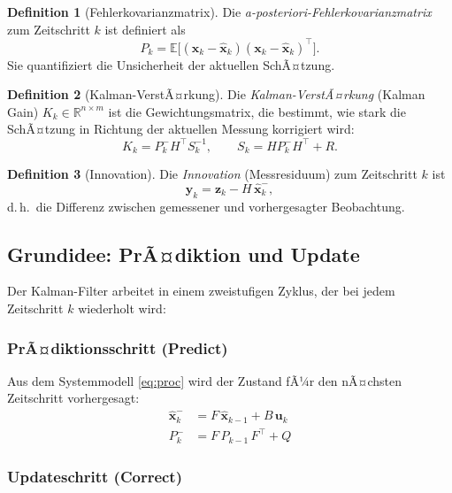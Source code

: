 ﻿\documentclass[a4paper,12pt]{article}
\theoremstyle{definition}
\newtheorem{definition}{Definition}
\begin{document}
\begin{definition}[Fehlerkovarianzmatrix]
    Die \emph{a-posteriori-Fehlerkovarianzmatrix} zum Zeitschritt $k$ ist definiert als
    \[
        P_k = \mathbb{E}\bigl[(\mathbf{x}_k - \hat{\mathbf{x}}_k)
                              (\mathbf{x}_k - \hat{\mathbf{x}}_k)^\top\bigr].
    \]
    Sie quantifiziert die Unsicherheit der aktuellen SchÃ¤tzung.
\end{definition}

\begin{definition}[Kalman-VerstÃ¤rkung]
    Die \emph{Kalman-VerstÃ¤rkung} (Kalman Gain) $K_k \in \mathbb{R}^{n \times m}$ ist
    die Gewichtungsmatrix, die bestimmt, wie stark die SchÃ¤tzung in Richtung der
    aktuellen Messung korrigiert wird:
    \[
        K_k = P_k^- H^\top S_k^{-1},
        \qquad S_k = H P_k^- H^\top + R.
    \]
\end{definition}

\begin{definition}[Innovation]
    Die \emph{Innovation} (Messresiduum) zum Zeitschritt $k$ ist
    \[
        \mathbf{y}_k = \mathbf{z}_k - H\,\hat{\mathbf{x}}_k^-,
    \]
    d.\,h.\ die Differenz zwischen gemessener und vorhergesagter Beobachtung.
\end{definition}

\subsection{Grundidee: PrÃ¤diktion und Update}

Der Kalman-Filter arbeitet in einem zweistufigen Zyklus, der bei jedem Zeitschritt $k$
wiederholt wird:

\subsubsection{PrÃ¤diktionsschritt (Predict)}

Aus dem Systemmodell \eqref{eq:proc} wird der Zustand fÃ¼r den nÃ¤chsten Zeitschritt
vorhergesagt:
\begin{align}
    \hat{\mathbf{x}}_k^- &= F\,\hat{\mathbf{x}}_{k-1} + B\,\mathbf{u}_k
        \label{eq:pred_state} \\
    P_k^- &= F\,P_{k-1}\,F^\top + Q
        \label{eq:pred_cov}
\end{align}

\subsubsection{Updateschritt (Correct)}
\end{document}
